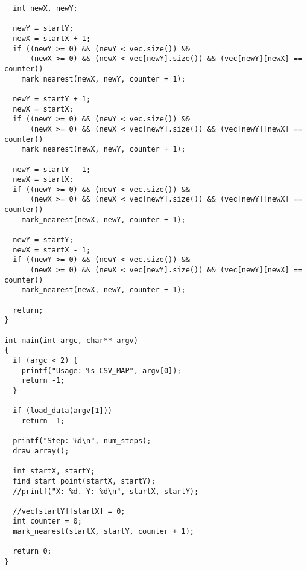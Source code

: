 \begin{verbatim}
  int newX, newY;

  newY = startY;
  newX = startX + 1;
  if ((newY >= 0) && (newY < vec.size()) &&
      (newX >= 0) && (newX < vec[newY].size()) && (vec[newY][newX] == counter))
    mark_nearest(newX, newY, counter + 1);

  newY = startY + 1;
  newX = startX;
  if ((newY >= 0) && (newY < vec.size()) &&
      (newX >= 0) && (newX < vec[newY].size()) && (vec[newY][newX] == counter))
    mark_nearest(newX, newY, counter + 1);

  newY = startY - 1;
  newX = startX;
  if ((newY >= 0) && (newY < vec.size()) &&
      (newX >= 0) && (newX < vec[newY].size()) && (vec[newY][newX] == counter))
    mark_nearest(newX, newY, counter + 1);

  newY = startY;
  newX = startX - 1;
  if ((newY >= 0) && (newY < vec.size()) &&
      (newX >= 0) && (newX < vec[newY].size()) && (vec[newY][newX] == counter))
    mark_nearest(newX, newY, counter + 1);

  return;
}

int main(int argc, char** argv)
{
  if (argc < 2) {
    printf("Usage: %s CSV_MAP", argv[0]);
    return -1;
  }

  if (load_data(argv[1]))
    return -1;

  printf("Step: %d\n", num_steps);
  draw_array();

  int startX, startY;
  find_start_point(startX, startY);
  //printf("X: %d. Y: %d\n", startX, startY);

  //vec[startY][startX] = 0;
  int counter = 0;
  mark_nearest(startX, startY, counter + 1);

  return 0;
}
\end{verbatim}

